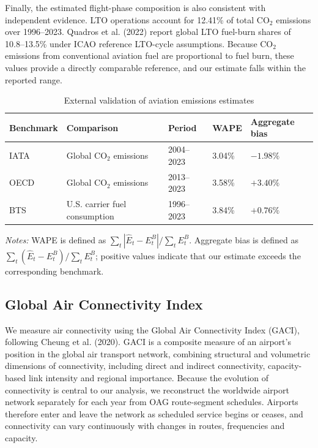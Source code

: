 \documentclass[12pt]{extarticle}
\begin{document}
Finally, the estimated flight-phase composition is also consistent with independent evidence. LTO operations account for 12.41\% of total CO$_2$ emissions over 1996--2023. Quadros et al. (2022) report global LTO fuel-burn shares of 10.8--13.5\% under ICAO reference LTO-cycle assumptions. Because CO$_2$ emissions from conventional aviation fuel are proportional to fuel burn, these values provide a directly comparable reference, and our estimate falls within the reported range.

\begin{table}[htbp]
\centering
\caption{External validation of aviation emissions estimates}
\label{tab:validation_benchmarks}
\small
\begin{tabular}{lllll}
\hline
Benchmark & Comparison & Period & WAPE & Aggregate bias \\
\hline
IATA & Global CO$_2$ emissions & 2004--2023 & 3.04\% & $-1.98\%$ \\
OECD & Global CO$_2$ emissions & 2013--2023 & 3.58\% & $+3.40\%$ \\
BTS & U.S. carrier fuel consumption & 1996--2023 & 3.84\% & $+0.76\%$ \\
\hline
\end{tabular}

\vspace{0.4em}
\begin{minipage}{0.96\linewidth}
\footnotesize\textit{Notes:} WAPE is defined as $\sum_t |\widehat{E}_t-E_t^B|/\sum_t E_t^B$. Aggregate bias is defined as $\sum_t(\widehat{E}_t-E_t^B)/\sum_t E_t^B$; positive values indicate that our estimate exceeds the corresponding benchmark.
\end{minipage}
\end{table}

\subsection*{Global Air Connectivity Index}

We measure air connectivity using the Global Air Connectivity Index (GACI), following Cheung et al. (2020). GACI is a composite measure of an airport's position in the global air transport network, combining structural and volumetric dimensions of connectivity, including direct and indirect connectivity, capacity-based link intensity and regional importance. Because the evolution of connectivity is central to our analysis, we reconstruct the worldwide airport network separately for each year from OAG route-segment schedules. Airports therefore enter and leave the network as scheduled service begins or ceases, and connectivity can vary continuously with changes in routes, frequencies and capacity.
\end{document}
